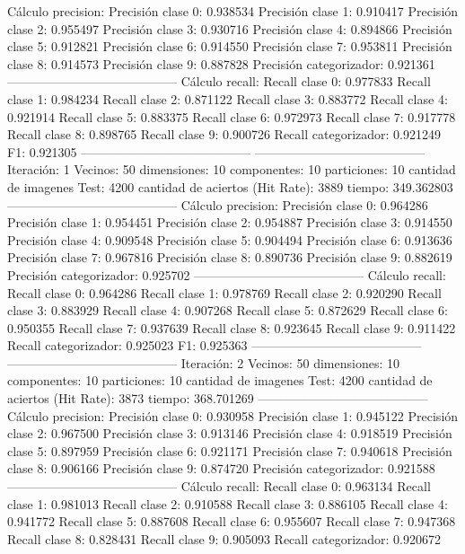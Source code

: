 Cálculo precision: 
Precisión clase 0: 0.938534
Precisión clase 1: 0.910417
Precisión clase 2: 0.955497
Precisión clase 3: 0.930716
Precisión clase 4: 0.894866
Precisión clase 5: 0.912821
Precisión clase 6: 0.914550
Precisión clase 7: 0.953811
Precisión clase 8: 0.914573
Precisión clase 9: 0.887828
Precisión categorizador: 0.921361
-----------------------------------------
Cálculo recall: 
Recall clase 0: 0.977833
Recall clase 1: 0.984234
Recall clase 2: 0.871122
Recall clase 3: 0.883772
Recall clase 4: 0.921914
Recall clase 5: 0.883375
Recall clase 6: 0.972973
Recall clase 7: 0.917778
Recall clase 8: 0.898765
Recall clase 9: 0.900726
Recall categorizador: 0.921249
F1: 0.921305
-----------------------------------------
-----------------------------------------
Iteración: 1
Vecinos: 50
dimensiones: 10
componentes: 10
particiones: 10
cantidad de imagenes Test: 4200
cantidad de aciertos (Hit Rate): 3889
tiempo: 349.362803
-----------------------------------------
Cálculo precision: 
Precisión clase 0: 0.964286
Precisión clase 1: 0.954451
Precisión clase 2: 0.954887
Precisión clase 3: 0.914550
Precisión clase 4: 0.909548
Precisión clase 5: 0.904494
Precisión clase 6: 0.913636
Precisión clase 7: 0.967816
Precisión clase 8: 0.890736
Precisión clase 9: 0.882619
Precisión categorizador: 0.925702
-----------------------------------------
Cálculo recall: 
Recall clase 0: 0.964286
Recall clase 1: 0.978769
Recall clase 2: 0.920290
Recall clase 3: 0.883929
Recall clase 4: 0.907268
Recall clase 5: 0.872629
Recall clase 6: 0.950355
Recall clase 7: 0.937639
Recall clase 8: 0.923645
Recall clase 9: 0.911422
Recall categorizador: 0.925023
F1: 0.925363
-----------------------------------------
-----------------------------------------
Iteración: 2
Vecinos: 50
dimensiones: 10
componentes: 10
particiones: 10
cantidad de imagenes Test: 4200
cantidad de aciertos (Hit Rate): 3873
tiempo: 368.701269
-----------------------------------------
Cálculo precision: 
Precisión clase 0: 0.930958
Precisión clase 1: 0.945122
Precisión clase 2: 0.967500
Precisión clase 3: 0.913146
Precisión clase 4: 0.918519
Precisión clase 5: 0.897959
Precisión clase 6: 0.921171
Precisión clase 7: 0.940618
Precisión clase 8: 0.906166
Precisión clase 9: 0.874720
Precisión categorizador: 0.921588
-----------------------------------------
Cálculo recall: 
Recall clase 0: 0.963134
Recall clase 1: 0.981013
Recall clase 2: 0.910588
Recall clase 3: 0.886105
Recall clase 4: 0.941772
Recall clase 5: 0.887608
Recall clase 6: 0.955607
Recall clase 7: 0.947368
Recall clase 8: 0.828431
Recall clase 9: 0.905093
Recall categorizador: 0.920672
